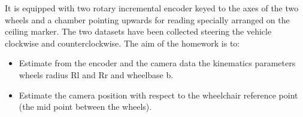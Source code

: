 It is equipped with two rotary incremental encoder keyed to the axes of the two wheels and a chamber pointing upwards for reading specially arranged on the ceiling marker.
The two datasets have been collected steering the vehicle clockwise and counterclockwise.
The aim of the homework is to:
\begin{itemize}
\item Estimate from the encoder and the camera data the kinematics parameters wheels radius Rl and Rr and wheelbase b.
\item Estimate the camera position with respect to the wheelchair reference point (the mid point between the wheels).
\end{itemize}